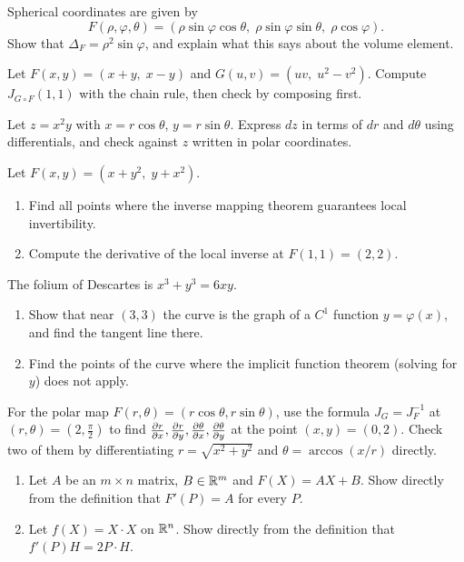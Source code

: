\begin{exercise}[2]
Spherical coordinates are given by
\[ F(\rho,\varphi,\theta)=(\rho\sin\varphi\cos\theta,\;\rho\sin\varphi\sin\theta,\;\rho\cos\varphi). \]
Show that $\Delta_F=\rho^2\sin\varphi$, and explain what this says about the volume element.
\end{exercise}

\begin{exercise}[1]
Let $F(x,y)=(x+y,\;x-y)$ and $G(u,v)=(uv,\;u^2-v^2)$. Compute $J_{G\circ F}(1,1)$ with the chain rule,
then check by composing first.
\end{exercise}

\begin{exercise}[2]
Let $z=x^2y$ with $x=r\cos\theta$, $y=r\sin\theta$. Express $dz$ in terms of $dr$ and $d\theta$ using
differentials, and check against $z$ written in polar coordinates.
\end{exercise}

\begin{exercise}[2]
Let $F(x,y)=(x+y^2,\;y+x^2)$.
\begin{enumerate}[label=(\alph*)]
  \item Find all points where the inverse mapping theorem guarantees local invertibility.
  \item Compute the derivative of the local inverse at $F(1,1)=(2,2)$.
\end{enumerate}
\end{exercise}

\begin{exercise}[2]
The folium of Descartes is $x^3+y^3=6xy$.
\begin{enumerate}[label=(\alph*)]
  \item Show that near $(3,3)$ the curve is the graph of a $C^1$ function $y=\varphi(x)$, and find
  the tangent line there.
  \item Find the points of the curve where the implicit function theorem (solving for $y$) does not apply.
\end{enumerate}
\end{exercise}

\begin{exercise}[3]
For the polar map $F(r,\theta)=(r\cos\theta,r\sin\theta)$, use the formula $J_G=J_F^{-1}$ at
$(r,\theta)=(2,\frac\pi2)$ to find $\frac{\partial r}{\partial x},\frac{\partial r}{\partial y},\frac{\partial \theta}{\partial x},\frac{\partial \theta}{\partial y}$ at the point $(x,y)=(0,2)$. Check
two of them by differentiating $r=\sqrt{x^2+y^2}$ and $\theta=\arccos(x/r)$ directly.
\end{exercise}

\begin{exercise}[3]
\begin{enumerate}[label=(\alph*)]
  \item Let $A$ be an $m\times n$ matrix, $B\in\mathbb{R}^m$ and $F(X)=AX+B$. Show directly from the definition
  that $F'(P)=A$ for every $P$.
  \item Let $f(X)=X\cdot X$ on $\mathbb{R}^n$. Show directly from the definition that $f'(P)H=2P\cdot H$.
\end{enumerate}
\end{exercise}
